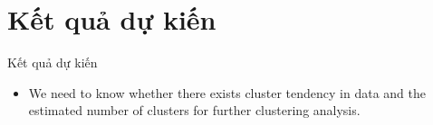\section{Kết quả dự kiến}\label{sec:intro}
\frame{\tableofcontents[currentsection]}
\begin{frame}{Kết quả dự kiến}

\begin{itemize}
    \item <1-> We need to know whether there exists cluster tendency in data and the estimated number of clusters for further clustering analysis.
\end{itemize}
\end{frame}

